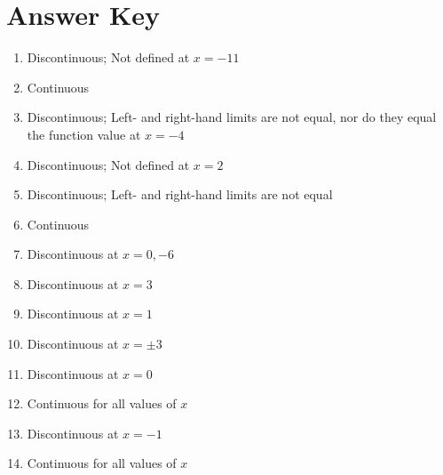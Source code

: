 \newpage

\section{Answer Key}

\begin{enumerate}
	\item Discontinuous; Not defined at $x = -11$
	\item Continuous
	\item Discontinuous; Left- and right-hand limits are not equal, nor do they equal the function value at $x = -4$
	\item Discontinuous; Not defined at $x = 2$
	\item Discontinuous; Left- and right-hand limits are not equal
	\item Continuous
	\item Discontinuous at $x = 0, -6$
	\item Discontinuous at $x = 3$
	\item Discontinuous at $x = 1$
	\item Discontinuous at $x = \pm 3$
	\item Discontinuous at $x = 0$
	\item Continuous for all values of $x$
	\item Discontinuous at $x = -1$
	\item Continuous for all values of $x$
\end{enumerate}